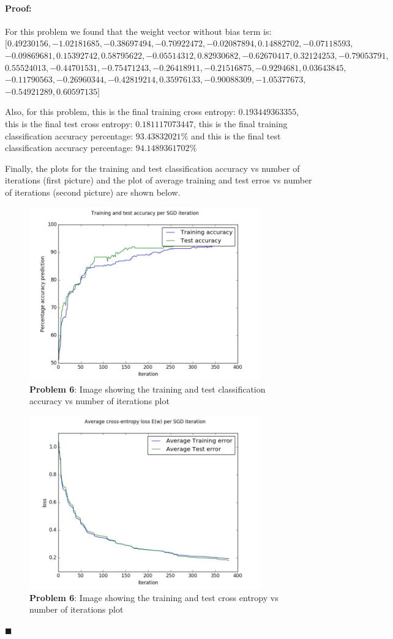 \documentclass[12pt]{article}
\newenvironment{proof}{\paragraph{Proof: }}{\hfill$\blacksquare$}
\begin{document}
\begin{proof}
For this problem we found that the weight vector without bias term is: $[ 0.49230156, -1.02181685, -0.38697494, -0.70922472, -0.02087894,  0.14882702,
 -0.07118593, $ $-0.09869681,  0.15392742,  0.58795622, -0.05514312,  0.82930682,
 -0.62670417,  0.32124253, -0.79053791,$ $ 0.55524013, -0.44701531, -0.75471243,
 -0.26418911, -0.21516875, -0.9294681,   0.03643845, $ $-0.11790563, -0.26960344,
 -0.42819214,  0.35976133, -0.90088309, -1.05377673,$ $ -0.54921289,  0.60597135]$

Also, for this problem, this is the final training cross entropy: $0.193449363355$, this is the final test cross entropy: $0.181117073447$, this is the final training classification accuracy percentage: $93.43832021\% $ and this is the final test classification accuracy percentage: $94.1489361702 \%$

Finally, the plots for the training and test classification accuracy vs number of iterations (first picture) and the plot of average training and test erros vs number of iterations (second picture) are shown below. 

\begin{figure}[!htbp]
\centering
\includegraphics[width=10cm]{hw2_p6_accuracy.jpg}
\caption{\textbf{Problem 6}: Image showing the training and test classification accuracy vs number of iterations plot}
\end{figure}

\begin{figure}[!htbp]
\centering
\includegraphics[width=10cm]{hw2_p6_cross_entropy.jpg}
\caption{\textbf{Problem 6}: Image showing the training and test cross entropy vs number of iterations plot}
\end{figure}

\end{proof}
\end{document}
